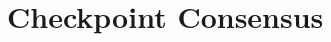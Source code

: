 \documentclass[a4paper,10pt,twoside]{report}
\author{\me}
\begin{document}


\normalsize

%
%
%
%
%
%
%
%
%
%
%
%
%
%
%
%
%
%

\chapter{Checkpoint Consensus}\label{chapter:consensus}


\clearemptydoublepage

%



%
%
%
\end{document}
